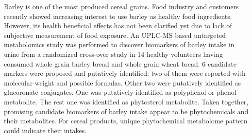 Barley is one of the most produced cereal grains. Food industry and customers recently showed increasing interest to use barley as healthy food ingredients. 
However, its health beneficial effects has not been clarified yet due to lack of subjective measurement of food exposure. 
An UPLC-MS based untargeted metabolomics study was performed to discover biomarkers of barley intake in urine from a randomized cross-over study in 14 healthy volunteers having consumed whole grain barley bread and whole grain wheat bread.
6 candidate markers were proposed and putatively identified: 
two of them were reported with molecular weight and possible formulas. Other two were putatively identified as glucoronate conjugates. One was putatively identified as polyphenol or phenol metabolite. The rest one was identified as phytosterol metabolite.
Taken together, promising candidate biomarkers of barley intake appear to be phytochemicals and their metabolites. 
For cereal products, unique phytochemical metabolome pattern could indicate their intakes.
